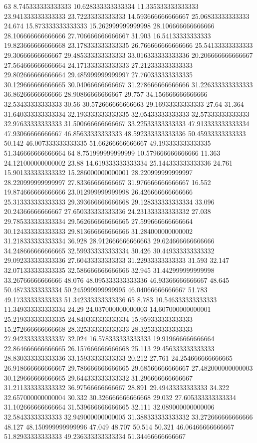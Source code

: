 63 8.745333333333333 10.628333333333334 11.335333333333333 23.941333333333333 23.72233333333333 14.593666666666667 25.06833333333333 24.674 15.873333333333333 15.262999999999998 28.106666666666666 28.106666666666666 27.706666666666667 31.903 16.54133333333333 19.823666666666668 23.178333333333335 26.766666666666666 25.54133333333333 29.30666666666667 29.485333333333333 33.016333333333336 20.206666666666667 27.564666666666664 24.171333333333333 27.212333333333333 29.802666666666664 29.485999999999997 27.760333333333335 30.129666666666665 30.04066666666667 31.278666666666666 31.226333333333333 36.86266666666666 28.90866666666667 29.757 34.156666666666666 32.53433333333333 30.56 30.572666666666663 29.16933333333333 27.64 31.364 31.640333333333334 32.193333333333335 32.05433333333333 32.57333333333333 32.97633333333333 31.500666666666667 33.22533333333333 47.913333333333334 47.93066666666667 46.85633333333333 48.592333333333336 50.45933333333333 50.142 46.007333333333335 51.66266666666667 49.193333333333335 51.346666666666664
64 8.751999999999999 10.579666666666666 11.363 24.121000000000002 23.88 14.619333333333334 25.144333333333336 24.761 15.901333333333332 15.286000000000001 28.220999999999997 28.220999999999997 27.83366666666667 31.976666666666667 16.552 19.874666666666666 23.012999999999998 26.426666666666666 25.313333333333333 29.393666666666668 29.128333333333334 33.096 20.24366666666667 27.650333333333336 24.231333333333332 27.038 29.785333333333334 29.562666666666665 27.599666666666664 30.124333333333333 29.813666666666666 31.284000000000002 31.218333333333334 36.928 28.912666666666663 29.624666666666666 34.248666666666665 32.599333333333334 30.426 30.449333333333332 29.092333333333336 27.60433333333333 31.22933333333333 31.593 32.147 32.071333333333335 32.586666666666666 32.945 31.442999999999998 33.26766666666666 48.076 48.095333333333336 46.93366666666667 48.645 50.48733333333334 50.245999999999995 46.04066666666667 51.783 49.17333333333333 51.342333333333336
65 8.783 10.546333333333333 11.349333333333334 24.29 24.037000000000003 14.607000000000001 25.219333333333335 24.840333333333334 15.959333333333333 15.272666666666668 28.325333333333333 28.325333333333333 27.942333333333337 32.024 16.578333333333333 19.919666666666664 22.864666666666665 26.157666666666668 25.113 29.456333333333333 28.830333333333336 33.15933333333333 20.212 27.761 24.254666666666665 26.918666666666667 29.786666666666665 29.68566666666667 27.482000000000003 30.129666666666665 29.644333333333332 31.296666666666667 31.211333333333332 36.97566666666667 28.891 29.49433333333333 34.322 32.657000000000004 30.332 30.326666666666668 29.032 27.605333333333334 31.102666666666664 31.539666666666665 32.111 32.089000000000006 32.58433333333333 32.949000000000005 31.388333333333332 33.272666666666666 48.127 48.150999999999996 47.049 48.707 50.514 50.321 46.06466666666667 51.82933333333333 49.236333333333334 51.34466666666667
